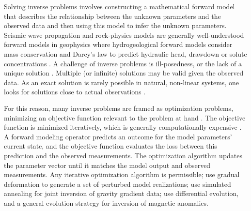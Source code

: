 Solving inverse problems involves constructing a mathematical forward model that describes the relationship between the unknown parameters and the observed data and then using this model to infer the unknown parameters. Seismic wave propagation and rock-physics models are generally well-understood forward models in geophysics \citep{grana2022probabilistic} where hydrogeological forward models consider mass conservation and Darcy's law to predict hydraulic head, drawdown or solute concentrations \citep{zhou2014inverse}. A challenge of inverse problems is ill-posedness, or the lack of a unique solution \citep{tarantola2005inverse}. Multiple (or infinite) solutions may be valid given the observed data. As an exact solution is rarely possible in natural, non-linear systems, one looks for solutions close to actual observations \citep{bardossy2016random}.

For this reason, many inverse problems are framed as optimization problems, minimizing an objective function relevant to the problem at hand \citep{giraud2019integration,nava-flores2023high,athens2022stochastic}. The objective function is minimized iteratively, which is generally computationally expensive \citep{zhou2014inverse}. A forward modeling operator predicts an outcome for the model parameters' current state, and the objective function evaluates the loss between this prediction and the observed measurements. The optimization algorithm updates the parameter vector until it matches the model output and observed measurements. Any iterative optimization algorithm is permissible; \cite{athens2022stochastic} use gradual deformation to generate a set of perturbed model realizations; \cite{nava-flores2023high} use simulated annealing for joint inversion of gravity gradient data; \cite{balkaya20173d} use differential evolution, and \cite{davilarodriguez2024threedimensional} a general evolution strategy for inversion of magnetic anomalies.



